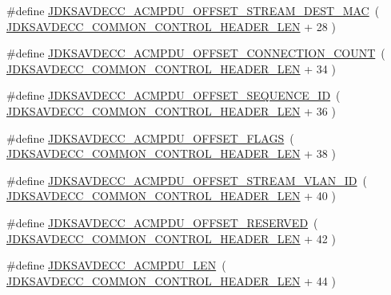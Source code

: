 \begin{DoxyCompactItemize}
\item 
\#define \hyperlink{group__acmpdu_ga8b2374ef4ca46b8464fbe4f42ceb575e}{J\+D\+K\+S\+A\+V\+D\+E\+C\+C\+\_\+\+A\+C\+M\+P\+D\+U\+\_\+\+O\+F\+F\+S\+E\+T\+\_\+\+S\+T\+R\+E\+A\+M\+\_\+\+D\+E\+S\+T\+\_\+\+M\+AC}~( \hyperlink{group__jdksavdecc__avtp__common__control__header_gaae84052886fb1bb42f3bc5f85b741dff}{J\+D\+K\+S\+A\+V\+D\+E\+C\+C\+\_\+\+C\+O\+M\+M\+O\+N\+\_\+\+C\+O\+N\+T\+R\+O\+L\+\_\+\+H\+E\+A\+D\+E\+R\+\_\+\+L\+EN} + 28 )
\item 
\#define \hyperlink{group__acmpdu_ga7adf002f51ba693e4be28ac84f5a93f3}{J\+D\+K\+S\+A\+V\+D\+E\+C\+C\+\_\+\+A\+C\+M\+P\+D\+U\+\_\+\+O\+F\+F\+S\+E\+T\+\_\+\+C\+O\+N\+N\+E\+C\+T\+I\+O\+N\+\_\+\+C\+O\+U\+NT}~( \hyperlink{group__jdksavdecc__avtp__common__control__header_gaae84052886fb1bb42f3bc5f85b741dff}{J\+D\+K\+S\+A\+V\+D\+E\+C\+C\+\_\+\+C\+O\+M\+M\+O\+N\+\_\+\+C\+O\+N\+T\+R\+O\+L\+\_\+\+H\+E\+A\+D\+E\+R\+\_\+\+L\+EN} + 34 )
\item 
\#define \hyperlink{group__acmpdu_ga0a473f7f653d82c13465ecf9945a6725}{J\+D\+K\+S\+A\+V\+D\+E\+C\+C\+\_\+\+A\+C\+M\+P\+D\+U\+\_\+\+O\+F\+F\+S\+E\+T\+\_\+\+S\+E\+Q\+U\+E\+N\+C\+E\+\_\+\+ID}~( \hyperlink{group__jdksavdecc__avtp__common__control__header_gaae84052886fb1bb42f3bc5f85b741dff}{J\+D\+K\+S\+A\+V\+D\+E\+C\+C\+\_\+\+C\+O\+M\+M\+O\+N\+\_\+\+C\+O\+N\+T\+R\+O\+L\+\_\+\+H\+E\+A\+D\+E\+R\+\_\+\+L\+EN} + 36 )
\item 
\#define \hyperlink{group__acmpdu_ga8c9ed657619402f01b4b990f7771a97c}{J\+D\+K\+S\+A\+V\+D\+E\+C\+C\+\_\+\+A\+C\+M\+P\+D\+U\+\_\+\+O\+F\+F\+S\+E\+T\+\_\+\+F\+L\+A\+GS}~( \hyperlink{group__jdksavdecc__avtp__common__control__header_gaae84052886fb1bb42f3bc5f85b741dff}{J\+D\+K\+S\+A\+V\+D\+E\+C\+C\+\_\+\+C\+O\+M\+M\+O\+N\+\_\+\+C\+O\+N\+T\+R\+O\+L\+\_\+\+H\+E\+A\+D\+E\+R\+\_\+\+L\+EN} + 38 )
\item 
\#define \hyperlink{group__acmpdu_ga9b49fbc5539a8f9890c0cc8536b9cd44}{J\+D\+K\+S\+A\+V\+D\+E\+C\+C\+\_\+\+A\+C\+M\+P\+D\+U\+\_\+\+O\+F\+F\+S\+E\+T\+\_\+\+S\+T\+R\+E\+A\+M\+\_\+\+V\+L\+A\+N\+\_\+\+ID}~( \hyperlink{group__jdksavdecc__avtp__common__control__header_gaae84052886fb1bb42f3bc5f85b741dff}{J\+D\+K\+S\+A\+V\+D\+E\+C\+C\+\_\+\+C\+O\+M\+M\+O\+N\+\_\+\+C\+O\+N\+T\+R\+O\+L\+\_\+\+H\+E\+A\+D\+E\+R\+\_\+\+L\+EN} + 40 )
\item 
\#define \hyperlink{group__acmpdu_gaeafce5e6657d3f102aaf71c57a2b67c9}{J\+D\+K\+S\+A\+V\+D\+E\+C\+C\+\_\+\+A\+C\+M\+P\+D\+U\+\_\+\+O\+F\+F\+S\+E\+T\+\_\+\+R\+E\+S\+E\+R\+V\+ED}~( \hyperlink{group__jdksavdecc__avtp__common__control__header_gaae84052886fb1bb42f3bc5f85b741dff}{J\+D\+K\+S\+A\+V\+D\+E\+C\+C\+\_\+\+C\+O\+M\+M\+O\+N\+\_\+\+C\+O\+N\+T\+R\+O\+L\+\_\+\+H\+E\+A\+D\+E\+R\+\_\+\+L\+EN} + 42 )
\item 
\#define \hyperlink{group__acmpdu_ga0c49ae21aa302b2800dd04cffd57b475}{J\+D\+K\+S\+A\+V\+D\+E\+C\+C\+\_\+\+A\+C\+M\+P\+D\+U\+\_\+\+L\+EN}~( \hyperlink{group__jdksavdecc__avtp__common__control__header_gaae84052886fb1bb42f3bc5f85b741dff}{J\+D\+K\+S\+A\+V\+D\+E\+C\+C\+\_\+\+C\+O\+M\+M\+O\+N\+\_\+\+C\+O\+N\+T\+R\+O\+L\+\_\+\+H\+E\+A\+D\+E\+R\+\_\+\+L\+EN} + 44 )
\end{DoxyCompactItemize}
